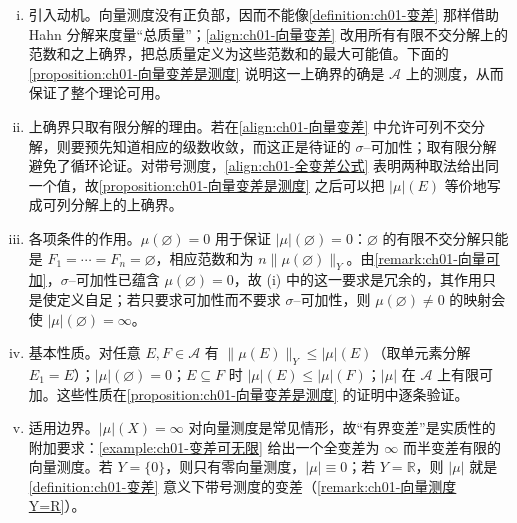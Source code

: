 \documentclass[../../main.tex]{subfiles}%
\begin{document}
\begin{remark}\label{remark:ch01-向量测度动机}
\begin{enumerate}[(i)]
\item 引入动机。向量测度没有正负部，因而不能像\cref{definition:ch01-变差} 那样借助 Hahn 分解来度量“总质量”；\eqref{align:ch01-向量变差} 改用所有有限不交分解上的范数和之上确界，把总质量定义为这些范数和的最大可能值。下面的\cref{proposition:ch01-向量变差是测度} 说明这一上确界的确是 $\mathcal{A}$ 上的测度，从而保证了整个理论可用。
\item 上确界只取有限分解的理由。若在\eqref{align:ch01-向量变差} 中允许可列不交分解，则要预先知道相应的级数收敛，而这正是待证的 $\sigma$--可加性；取有限分解避免了循环论证。对带号测度，\eqref{align:ch01-全变差公式} 表明两种取法给出同一个值，故\cref{proposition:ch01-向量变差是测度} 之后可以把 $|\mu|(E)$ 等价地写成可列分解上的上确界。
\item 各项条件的作用。$\mu(\varnothing)=0$ 用于保证 $|\mu|(\varnothing)=0$：$\varnothing$ 的有限不交分解只能是 $F_1=\cdots =F_n=\varnothing$，相应范数和为 $n\|\mu(\varnothing)\|_Y$。由\cref{remark:ch01-向量可加}，$\sigma$--可加性已蕴含 $\mu(\varnothing)=0$，故 (i) 中的这一要求是冗余的，其作用只是使定义自足；若只要求可加性而不要求 $\sigma$--可加性，则 $\mu(\varnothing)\neq0$ 的映射会使 $|\mu|(\varnothing)=\infty$。
\item 基本性质。对任意 $E,F\in\mathcal{A}$ 有 $\|\mu(E)\|_Y\leqslant|\mu|(E)$（取单元素分解 $E_1=E$）；$|\mu|(\varnothing)=0$；$E\subseteq F$ 时 $|\mu|(E)\leqslant|\mu|(F)$；$|\mu|$ 在 $\mathcal{A}$ 上有限可加。这些性质在\cref{proposition:ch01-向量变差是测度} 的证明中逐条验证。
\item 适用边界。$|\mu|(X)=\infty$ 对向量测度是常见情形，故“有界变差”是实质性的附加要求：\cref{example:ch01-变差可无限} 给出一个全变差为 $\infty$ 而半变差有限的向量测度。若 $Y=\{0\}$，则只有零向量测度，$|\mu|\equiv0$；若 $Y=\mathbb{R}$，则 $|\mu|$ 就是\cref{definition:ch01-变差} 意义下带号测度的变差（\cref{remark:ch01-向量测度Y=R}）。
\end{enumerate}
\end{remark}
\end{document}
